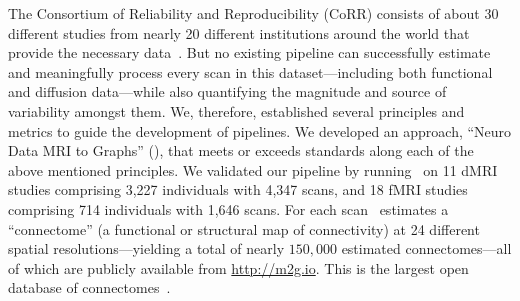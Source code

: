 \documentclass[11pt]{article}
\begin{document}
The Consortium of Reliability and Reproducibility (CoRR) consists of about 30 different studies from nearly 20 different institutions around the world that provide the necessary data~\cite{corr}. But no existing pipeline can successfully estimate and meaningfully process every scan in this dataset---including both functional and diffusion data---while also quantifying the magnitude and source of variability amongst them. 
We, therefore, established several principles and metrics to guide the development of pipelines.  
We developed an approach, ``Neuro Data MRI to Graphs'' (\ndmg), that 
meets or exceeds standards along each of the above mentioned principles. We validated our pipeline by running \ndmg~on 11 dMRI  studies comprising 3,227 individuals with 4,347 scans, 
and 18 fMRI  studies comprising 714 individuals with 1,646 scans. 
For each scan \ndmg~estimates  a ``connectome'' (a functional or structural map of connectivity) at 24 different spatial resolutions---yielding a total of nearly  $150,000$ estimated connectomes---all of which are publicly available from \url{http://m2g.io}. This is the largest open database of connectomes~\cite{brown2016connected}.
\end{document}
